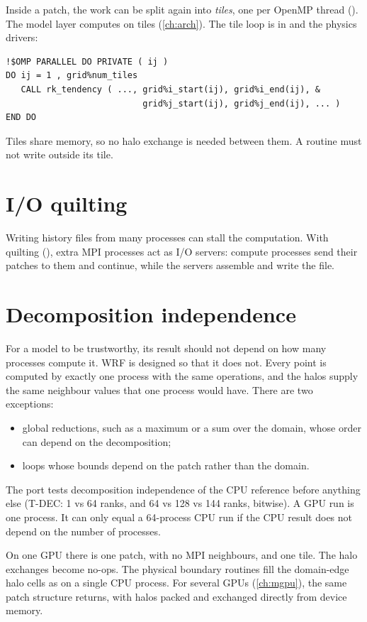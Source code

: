 Inside a patch, the work can be split again into \emph{tiles}, one per OpenMP thread (). The model
layer computes on tiles (\cref{ch:arch}). The tile loop is in  and the physics drivers:
\begin{lstlisting}
!$OMP PARALLEL DO PRIVATE ( ij )
DO ij = 1 , grid%num_tiles
   CALL rk_tendency ( ..., grid%i_start(ij), grid%i_end(ij), &
                           grid%j_start(ij), grid%j_end(ij), ... )
END DO
\end{lstlisting}
Tiles share memory, so no halo exchange is needed between them. A routine must not write outside its tile.

\section{I/O quilting}

Writing history files from many processes can stall the computation. With quilting (),
extra MPI processes act as I/O servers: compute processes send their patches to them and continue, while the servers
assemble and write the file.

\section{Decomposition independence}

For a model to be trustworthy, its result should not depend on how many processes compute it. WRF is designed so that
it does not. Every point is computed by exactly one process with the same operations, and the halos supply the same
neighbour values that one process would have. There are two exceptions:
\begin{itemize}
  \item global reductions, such as a maximum or a sum over the domain, whose order can depend on the decomposition;
  \item loops whose bounds depend on the patch rather than the domain.
\end{itemize}
The port tests decomposition independence of the CPU reference before anything else (T-DEC: 1 vs 64 ranks, and 64 vs
128 vs 144 ranks, bitwise). A GPU run is one process. It can only equal a 64-process CPU run if the CPU result does
not depend on the number of processes.

\begin{portnote}
On one GPU there is one patch, with no MPI neighbours, and one tile. The halo exchanges become no-ops. The physical
boundary routines fill the domain-edge halo cells as on a single CPU process. For several GPUs (\cref{ch:mgpu}), the
same patch structure returns, with halos packed and exchanged directly from device memory.
\end{portnote}

